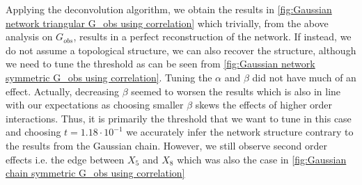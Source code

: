 \documentclass[../Thesis.tex]{subfiles}
\begin{document}
Applying the deconvolution algorithm, we obtain the results in \autoref{fig:Gaussian network triangular G_obs using correlation} which trivially, from the above analysis on $G_{obs}$, results in a perfect reconstruction of the network. If instead, we do not assume a topological structure, we can also recover the structure, although we need to tune the threshold as can be seen from \autoref{fig:Gaussian network symmetric G_obs using correlation}. Tuning the $\alpha$ and $\beta$ did not have much of an effect. Actually, decreasing $\beta$ seemed to worsen the results which is also in line with our expectations as choosing smaller $\beta$ skews the effects of higher order interactions. Thus, it is primarily the threshold that we want to tune in this case and choosing $t = 1.18 \cdot 10^{-1}$ we accurately infer the network structure contrary to the results from the Gaussian chain. However, we still observe second order effects i.e. the edge between $X_5$ and $X_8$ which was also the case in \autoref{fig:Gaussian chain symmetric G_obs using correlation}
\end{document}
